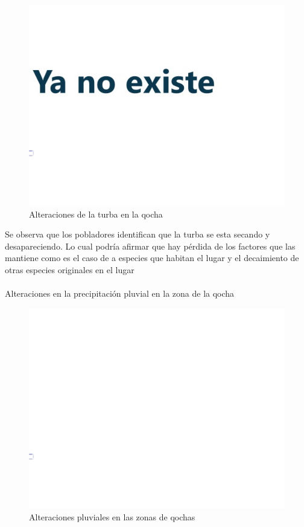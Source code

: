 \documentclass[12pt]{article}\usepackage[]{graphicx}\usepackage[]{xcolor}
\makeatletter
\def\maxwidth{ %
  \ifdim\Gin@nat@width>\linewidth
    \linewidth
  \else
    \Gin@nat@width
  \fi
}
\newenvironment{knitrout}{}{} %
\makeatother
\begin{document}
	\begin{figure}[H]
	\centering
\begin{knitrout}
\color{fgcolor}
\includegraphics[width=\maxwidth]{figure/treintaycuatro-1} 
\end{knitrout}
	\caption{Alteraciones de la turba en la qocha}
	\end{figure}
	Se observa que los pobladores identifican que la turba se esta secando y desapareciendo. Lo cual podría afirmar que hay pérdida de los factores que las mantiene como es el caso de a especies que habitan el lugar y el decaimiento de otras especies originales en el lugar\\
	\\
	Alteraciones en la precipitación pluvial en la zona de la qocha
	\begin{figure}[H]
	\centering
\begin{knitrout}
\color{fgcolor}
\includegraphics[width=\maxwidth]{figure/treintaycinco-1} 
\end{knitrout}
	\caption{Alteraciones pluviales en las zonas de qochas}
	\end{figure}
\end{document}

